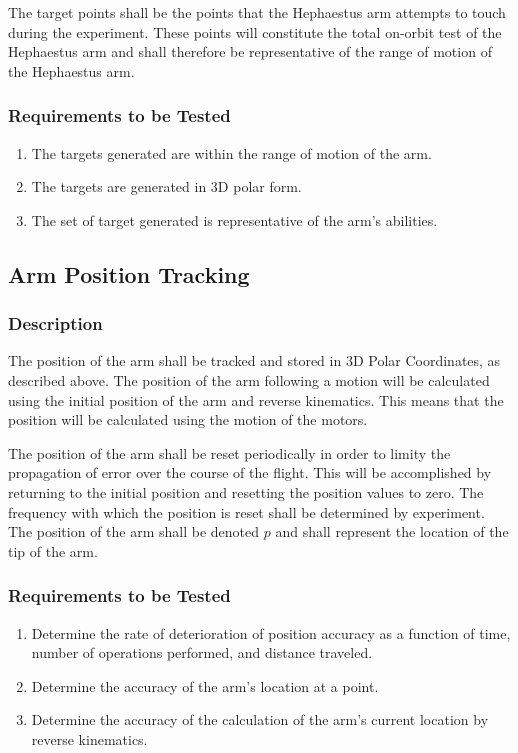 \documentclass[letterpaper,10pt]{article}
\begin{document}
The target points shall be the points that the Hephaestus arm attempts to touch 
during the experiment. These points will constitute the total on-orbit test of
the Hephaestus arm and shall therefore be representative of the range of motion
of the Hephaestus arm.

\subsubsection{Requirements to be Tested}
\begin{enumerate}
\item{The targets generated are within the range of motion of the arm.}
\item{The targets are generated in 3D polar form.}
\item{The set of target generated is representative of the arm's abilities.}
\end{enumerate}

\subsection{Arm Position Tracking}
\subsubsection{Description}
The position of the arm shall be tracked and stored in 3D Polar Coordinates, as
described above. The position of the arm following a motion will be calculated
using the initial position of the arm and reverse kinematics. This means that
the position will be calculated using the motion of the motors.

The position of the arm shall be reset periodically in order to limity the 
propagation of error over the course of the flight. This will be accomplished by
returning to the initial position and resetting the position values to zero. The
frequency with which the position is reset shall be determined by experiment.
The position of the arm shall be denoted \(p\) and shall represent the location
of the tip of the arm.

\subsubsection{Requirements to be Tested}
\begin{enumerate}
\item{Determine the rate of deterioration of position accuracy as a function of
time, number of operations performed, and distance traveled.}
\item{Determine the accuracy of the arm's location at a point.}
\item{Determine the accuracy of the calculation of the arm's current location by
reverse kinematics.}
\end{enumerate}
\end{document}
